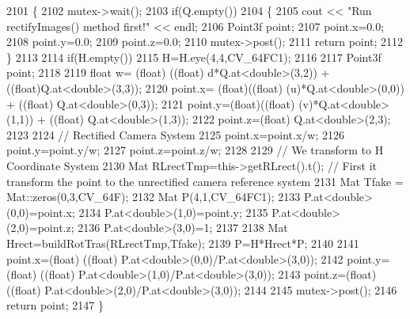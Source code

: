 \begin{DoxyCode}
2101 \{
2102     mutex->wait();
2103     \textcolor{keywordflow}{if}(Q.empty())
2104     \{
2105         cout << \textcolor{stringliteral}{"Run rectifyImages() method first!"} << endl;
2106         Point3f point;
2107         point.x=0.0;
2108         point.y=0.0;
2109         point.z=0.0;
2110         mutex->post();
2111         \textcolor{keywordflow}{return} point;
2112     \}
2113 
2114     \textcolor{keywordflow}{if}(H.empty())
2115         H=H.eye(4,4,CV\_64FC1);
2116 
2117     Point3f point;
2118 
2119     \textcolor{keywordtype}{float} w= (float) ((\textcolor{keywordtype}{float}) d*Q.at<\textcolor{keywordtype}{double}>(3,2)) + ((float)Q.at<\textcolor{keywordtype}{double}>(3,3));
2120     point.x= (float)((\textcolor{keywordtype}{float}) (u)*Q.at<\textcolor{keywordtype}{double}>(0,0)) + ((\textcolor{keywordtype}{float}) Q.at<\textcolor{keywordtype}{double}>(0,3));
2121     point.y=(float)((\textcolor{keywordtype}{float}) (v)*Q.at<\textcolor{keywordtype}{double}>(1,1)) + ((\textcolor{keywordtype}{float}) Q.at<\textcolor{keywordtype}{double}>(1,3));
2122     point.z=(float) Q.at<\textcolor{keywordtype}{double}>(2,3);
2123 
2124     \textcolor{comment}{// Rectified Camera System}
2125     point.x=point.x/w;
2126     point.y=point.y/w;
2127     point.z=point.z/w;
2128 
2129     \textcolor{comment}{// We transform to H Coordinate System}
2130     Mat RLrectTmp=this->getRLrect().t(); \textcolor{comment}{// First it transform the point to the unrectified camera
       reference system}
2131     Mat Tfake = Mat::zeros(0,3,CV\_64F);
2132     Mat P(4,1,CV\_64FC1);
2133     P.at<\textcolor{keywordtype}{double}>(0,0)=point.x;
2134     P.at<\textcolor{keywordtype}{double}>(1,0)=point.y;
2135     P.at<\textcolor{keywordtype}{double}>(2,0)=point.z;
2136     P.at<\textcolor{keywordtype}{double}>(3,0)=1;
2137 
2138     Mat Hrect=buildRotTras(RLrectTmp,Tfake);
2139     P=H*Hrect*P;
2140 
2141     point.x=(float) ((\textcolor{keywordtype}{float}) P.at<\textcolor{keywordtype}{double}>(0,0)/P.at<\textcolor{keywordtype}{double}>(3,0));
2142     point.y=(float) ((\textcolor{keywordtype}{float}) P.at<\textcolor{keywordtype}{double}>(1,0)/P.at<\textcolor{keywordtype}{double}>(3,0));
2143     point.z=(float) ((\textcolor{keywordtype}{float}) P.at<\textcolor{keywordtype}{double}>(2,0)/P.at<\textcolor{keywordtype}{double}>(3,0));
2144 
2145     mutex->post();
2146     \textcolor{keywordflow}{return} point;
2147 \}
\end{DoxyCode}
